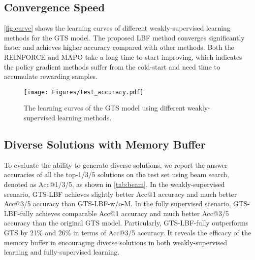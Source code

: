 \subsection{Convergence Speed}
\autoref{fig:curve} shows the learning curves of different weakly-supervised learning methods for the GTS model. The proposed LBF method converges significantly faster and achieves higher accuracy compared with other methods. Both the REINFORCE and MAPO take a long time to start improving, which indicates the policy gradient methods suffer from the cold-start and need time to accumulate rewarding samples. 


\begin{figure}[htbp]
    \centering
    \texttt{[image: Figures/test\_accuracy.pdf]}
    \caption{The learning curves of the GTS model using different weakly-supervised learning methods.}
    \label{fig:curve}
    \vspace{-5mm}
\end{figure}
\subsection{Diverse Solutions with Memory Buffer}
To evaluate the ability to generate diverse solutions, we report the answer accuracies of all the top-1/3/5 solutions on the test set using beam search, denoted as Acc@1/3/5, as shown in \autoref{tab:beam}. In the weakly-supervised scenario, GTS-LBF achieves slightly better Acc@1 accuracy and much better Acc@3/5 accuracy than GTS-LBF-w/o-M. In the fully supervised scenario, GTS-LBF-fully achieves comparable Acc@1 accuracy and much better Acc@3/5 accuracy than the original GTS model. Particularly, GTS-LBF-fully outperforms GTS by 21\% and 26\% in terms of Acc@3/5 accuracy. It reveals the efficacy of the memory buffer in encouraging diverse solutions in both weakly-supervised learning and fully-supervised learning.

